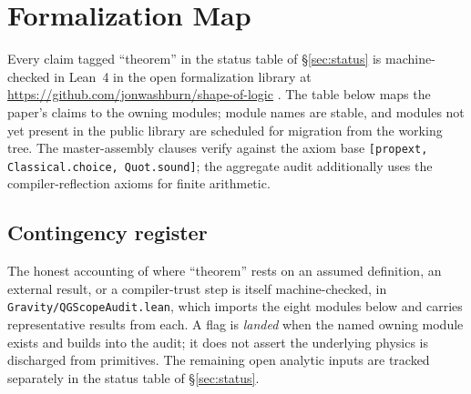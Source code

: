 \documentclass[11pt,letterpaper]{article}
\theoremstyle{definition}
\begin{document}
\section{Formalization Map}
\label{app:lean}

Every claim tagged ``theorem'' in the status table of
\S\ref{sec:status} is machine-checked in Lean~4 in the open
formalization library at
\url{https://github.com/jonwashburn/shape-of-logic}
\cite{Formalization}.  The table below maps the paper's claims to the
owning modules; module names are stable, and modules not yet present
in the public library are scheduled for migration from the working
tree.  The master-assembly clauses verify against the axiom base
\texttt{[propext, Classical.choice, Quot.sound]}; the aggregate audit
additionally uses the compiler-reflection axioms for finite
arithmetic.

\subsection{Contingency register}
\label{app:contingency}

The honest accounting of where ``theorem'' rests on an assumed
definition, an external result, or a compiler-trust step is itself
machine-checked, in \texttt{Gravity/QGScopeAudit.lean}, which imports
the eight modules below and carries representative results from each.
A flag is \emph{landed} when the named owning module exists and builds
into the audit; it does not assert the underlying physics is discharged
from primitives.  The remaining open analytic inputs are tracked
separately in the status table of \S\ref{sec:status}.
\end{document}
